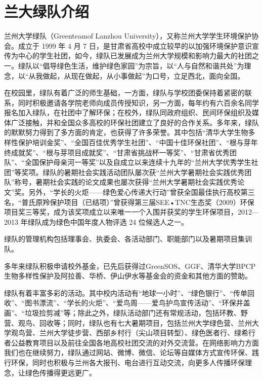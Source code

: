 \documentclass[UTF8,a4paper，12pt]{ctexart}
\begin{document}
\section*{兰大绿队介绍}
兰州大学绿队（Greenteamof Lanzhou University），又称兰州大学学生环境保护协会。成立于 1999 年 4 月 7 日，是甘肃省高校中成立较早的以加强环境保护意识宣传为中心的学生社团，如今，绿队已发展成为兰州大学规模和影响力最大的社团之一。绿队以“倡导绿色生活，维护绿色家园”为宗旨，以“人与自然和谐共处”为理念，以“从我做起，从现在做起，从小事做起”为口号，立足西北，面向全国。\\
\par 在校园里，绿队有着广泛的师生基础，一方面，绿队与学校团委保持着紧密的联系，同时积极邀请各学院老师向成员传授知识，另一方面，每年约有六百余名同学报名加入绿队，在社团中了解环保；在校外，绿队同政府组织、民间环保组织及媒体广泛接触，并和全国众多高校的环保社团建立了良好的合作关系。多年来，绿队的默默努力得到了多方面的肯定，也获得了许多荣誉。其中包括“清华大学生物多样性保护培训金奖”、“全国百佳优秀学生社团”、“中国十佳环保社团”、“根与芽年终成就奖”、“根与芽项目成就奖”、“甘肃省挑战杯一等奖”、“甘肃省优秀团队”、“全国保护母亲河一等奖”以及自成立以来连续十九年的“兰州大学优秀学生社团”等奖项。绿队的暑期社会实践活动团队屡次获“兰州大学暑期社会实践优秀团队”称号，暑期社会实践的论文成果也屡次获得“兰州大学暑期社会实践优秀论文”奖。另外，“学长的火炬——绿色爱心传递大行动”曾获全国最佳执行高校第三名，“普氏原羚保护项目（已结项）”曾获得第三届SEE•TNC生态奖（2009）环保项目奖三等奖，成为该奖项成立以来唯一一个入围并获奖的学生环保项目，2012—2013 年绿队成为绿色中国年度人物评选 24 位候选人之一。\\
\par 绿队的管理机构包括理事会、执委会、各活动部门、职能部门以及暑期项目集训队。\\
\par 多年来绿队积极申请校外基金，已先后获得过GreenSOS、GGF、清华大学BPCP生物多样性保护及阿拉善、华桥、伊山伊水等基金会的资金和其他方面的赞助。\\
\par 绿队有着丰富多彩的活动。其中校内活动有“地球一小时”、“绿色银行”、“传单回收”、“图书漂流”、“学长的火炬”、“爱鸟周——爱鸟护鸟宣传活动”、“环保井盖画”、“垃圾捡剪减”等；除此之外，绿队活动部门还有常规活动，包括环教、野营、观鸟、回收等；同时，绿队也有七大暑期项目，包括兰州大学绿色营、兰州大学观鸟营、兰州大学徒步营、西部乡村行（尖山项目转型）、绿色医者行、绿希行者公益教育项目以及前往全国各地高校社团交流的对外交流营。在网络影响力方面我们也在继续努力，绿队通过网站、微博、微信、论坛等自媒体方式宣传环保、践行环保，同时也积极与兰州各大报刊、电台进行互动交流，向更多人传播环保理念，让绿色传播得更远更广。
\end{document}
